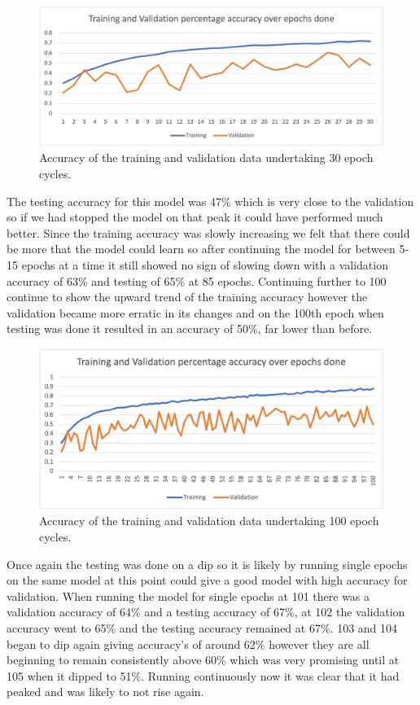 \begin{figure}[H]
\centering
\includegraphics[scale=0.85]{Media/Vali/val1.png}
\caption{Accuracy of the training and validation data undertaking 30 epoch cycles.}
\label{figva1}
\end{figure}

The testing accuracy for this model was 47\% which is very close to the validation so if we had stopped the model on that peak it could have performed much better. Since the training accuracy was slowly increasing we felt that there could be more that the model could learn so after continuing the model for between 5-15 epochs at a time it still showed no sign of slowing down with a validation accuracy of 63\% and testing of 65\% at 85 epochs. Continuing further to 100 continue to show the upward trend of the training accuracy however the validation became more erratic in its changes and on the 100th epoch when testing was done it resulted in an accuracy of 50\%, far lower than before. \\

\begin{figure}[H]
\centering
\includegraphics[scale=0.95]{Media/Vali/val2.png}
\caption{Accuracy of the training and validation data undertaking 100 epoch cycles.}
\label{figval2}
\end{figure}

Once again the testing was done on a dip so it is likely by running single epochs on the same model at this point could give a good model with high accuracy for validation. When running the model for single epochs at 101 there was a validation accuracy of 64\% and a testing accuracy of 67\%, at 102 the validation accuracy went to 65\% and the testing accuracy remained at 67\%. 103 and 104 began to dip again giving accuracy's of around 62\% however they are all beginning to remain consistently above 60\% which was very promising until at 105 when it dipped to 51\%. Running continuously now it was clear that it had peaked and was likely to not rise again. 
